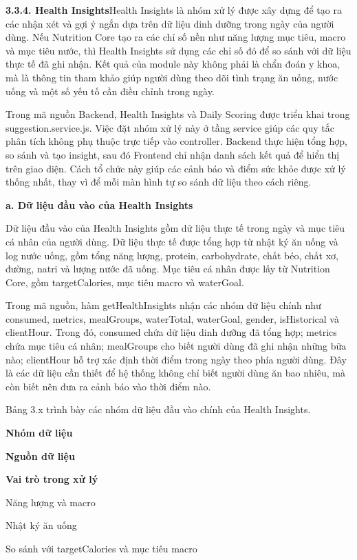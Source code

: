 \textbf{3.3.4. Health Insights}Health Insights là nhóm xử lý được xây dựng để tạo ra các nhận xét và gợi ý ngắn dựa trên dữ liệu dinh dưỡng trong ngày của người dùng. Nếu Nutrition Core tạo ra các chỉ số nền như năng lượng mục tiêu, macro và mục tiêu nước, thì Health Insights sử dụng các chỉ số đó để so sánh với dữ liệu thực tế đã ghi nhận. Kết quả của module này không phải là chẩn đoán y khoa, mà là thông tin tham khảo giúp người dùng theo dõi tình trạng ăn uống, nước uống và một số yếu tố cần điều chỉnh trong ngày.

Trong mã nguồn Backend, Health Insights và Daily Scoring được triển khai trong suggestion.service.js. Việc đặt nhóm xử lý này ở tầng service giúp các quy tắc phân tích không phụ thuộc trực tiếp vào controller. Backend thực hiện tổng hợp, so sánh và tạo insight, sau đó Frontend chỉ nhận danh sách kết quả để hiển thị trên giao diện. Cách tổ chức này giúp các cảnh báo và điểm sức khỏe được xử lý thống nhất, thay vì để mỗi màn hình tự so sánh dữ liệu theo cách riêng.

\textbf{a. Dữ liệu đầu vào của Health Insights}

Dữ liệu đầu vào của Health Insights gồm dữ liệu thực tế trong ngày và mục tiêu cá nhân của người dùng. Dữ liệu thực tế được tổng hợp từ nhật ký ăn uống và log nước uống, gồm tổng năng lượng, protein, carbohydrate, chất béo, chất xơ, đường, natri và lượng nước đã uống. Mục tiêu cá nhân được lấy từ Nutrition Core, gồm targetCalories, mục tiêu macro và waterGoal.

Trong mã nguồn, hàm getHealthInsights nhận các nhóm dữ liệu chính như consumed, metrics, mealGroups, waterTotal, waterGoal, gender, isHistorical và clientHour. Trong đó, consumed chứa dữ liệu dinh dưỡng đã tổng hợp; metrics chứa mục tiêu cá nhân; mealGroups cho biết người dùng đã ghi nhận những bữa nào; clientHour hỗ trợ xác định thời điểm trong ngày theo phía người dùng. Đây là các dữ liệu cần thiết để hệ thống không chỉ biết người dùng ăn bao nhiêu, mà còn biết nên đưa ra cảnh báo vào thời điểm nào.

Bảng 3.x trình bày các nhóm dữ liệu đầu vào chính của Health Insights.

\textbf{Nhóm dữ liệu}

\textbf{Nguồn dữ liệu}

\textbf{Vai trò trong xử lý}

Năng lượng và macro

Nhật ký ăn uống

So sánh với targetCalories và mục tiêu macro

